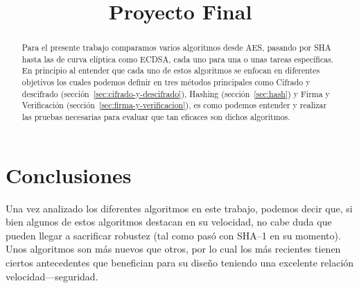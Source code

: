 \documentclass[onecolumn]{IEEEtran}
\begin{document}


\title{Proyecto Final}
\author{
  }

\maketitle{}

\tableofcontents{}

\begin{abstract}
    Para el presente trabajo comparamos varios algoritmos desde AES, pasando por SHA hasta las de curva elíptica como ECDSA, cada uno para una o unas tareas específicas. En principio al entender que cada uno de estos algoritmos se enfocan en diferentes objetivos los cuales podemos definir en tres métodos principales como Cifrado y descifrado (sección~\ref{sec:cifrado-y-descifrado}), Hashing (sección~\ref{sec:hash}) y Firma y Verificación (sección~\ref{sec:firma-y-verificacion}), es como podemos entender y realizar las pruebas necesarias para evaluar que tan eficaces son dichos algoritmos.
\end{abstract}



\newpage{}



\clearpage{}

\section{Conclusiones}\label{sec:concluciones}

Una vez analizado los diferentes algoritmos en este trabajo, podemos decir que, si bien algunos de estos algoritmos destacan en su velocidad, no cabe duda que pueden llegar a sacrificar robustez (tal como pasó con SHA–1 en su momento). Unos algoritmos son más nuevos que otros, por lo cual los más recientes tienen ciertos antecedentes que benefician para su diseño teniendo una excelente relación velocidad—seguridad.
\end{document}

